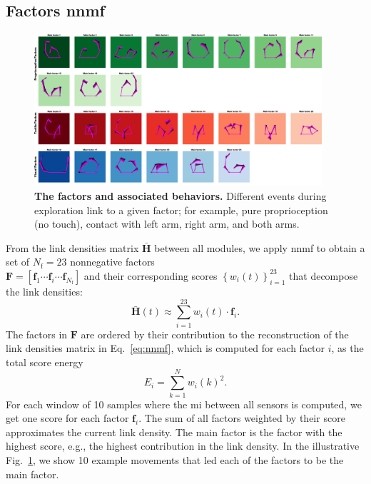 \subsection{Factors \ac{nnmf}}
\begin{figure}[!t]
	\begin{center}
		\hspace*{\fill}
        \includegraphics[width=0.95\textwidth]{fig/mainfactors_represente.png}
		\hspace*{\fill}
	\end{center}
	\caption{\textbf{The factors and associated behaviors.} Different events during exploration link to a given factor; for example, pure proprioception (no touch), contact with left arm, right arm, and both arms.}
    \label{fig:main_factors}
\end{figure}
From the link densities matrix $\bar{\bm{H}}$ between all modules, we apply \ac{nnmf} to obtain a set of $N_\text{f} = 23$ nonnegative factors\\ $\bm{F} = [ \bm{f}_1 \cdots \bm{f}_i \cdots \bm{f}_{N_\text{f}}]$ and their corresponding scores $\left\lbrace w_i(t)\right\rbrace^{23}_{i=1}$
that decompose the link densities:
\begin{equation}
    \bar{\bm{H}}(t)\approx \sum_{i=1}^{23} w_i(t)\cdot\bm{f}_i.
\end{equation}
The factors in $\mathbf{F}$ are ordered by their contribution to the reconstruction of the link densities matrix in Eq.~\ref{eq:nnmf}, which is computed for each factor $i$, as the total score energy
\begin{equation}
    E_i =  \sum_{k=1}^N w_i(k)^2.
\end{equation}
For each window of 10 samples where the \ac{mi} between all sensors is computed, we get one score for each factor $\bm{f}_i$. The sum of all factors weighted by their score approximates the current link density. The main factor is the factor with the highest score, e.g., the highest contribution in the link density. In the illustrative Fig.~\ref{fig:main_factors}, we show 10 example movements that led each of the factors to be the main factor.

